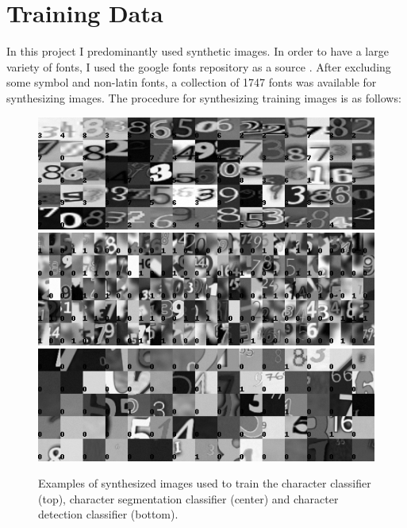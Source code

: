 \documentclass[12pt]{article}
\begin{document}
\section{Training Data}
In this project I predominantly used synthetic images. In order to have a large variety of fonts,
I used the google fonts repository as a source \cite{googlefo53:online}. After excluding some
symbol and non-latin fonts, a collection of 1747 fonts was available for synthesizing images.
The procedure for synthesizing training images is as follows:

\begin{figure}[ht!]
  \centering
  \includegraphics[width=1.0\linewidth]{fig/training_example_images/classifier}
  \includegraphics[width=1.0\linewidth]{fig/training_example_images/segmentation}
  \includegraphics[width=1.0\linewidth]{fig/training_example_images/detection}
  \caption
  {
    Examples of synthesized images used to train the character classifier (top),
    character segmentation classifier (center) and character detection classifier (bottom).
  }
  \label{fig:training_images}
\end{figure}
\end{document}
